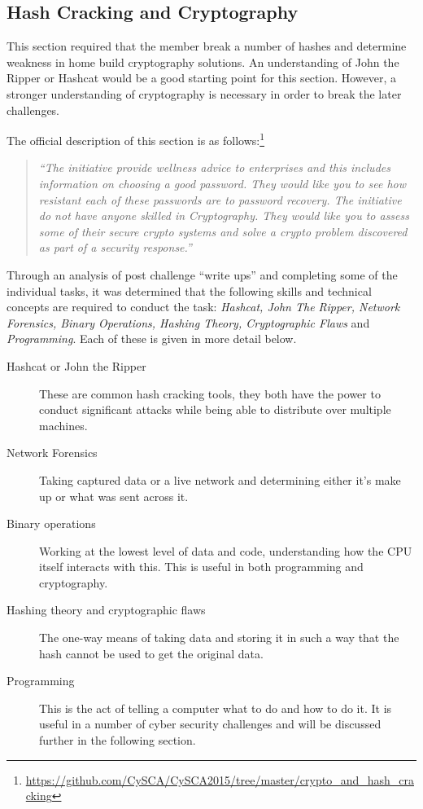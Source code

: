 \documentclass[a4paper,11pt]{report}
\begin{document}
		\subsection{Hash Cracking and Cryptography}
			This section required that the member break a number of hashes and determine weakness in home build cryptography solutions. 
			An understanding of John the Ripper or Hashcat would be a good starting point for this section. 
			However, a stronger understanding of cryptography is necessary in order to break the later challenges. 
			
			The official description of this section is as follows:\footnote{\url{https://github.com/CySCA/CySCA2015/tree/master/crypto\_and\_hash\_cracking}}
			\begin{quote}
				\textit{``The initiative provide wellness advice to enterprises and this includes information on choosing a good password. They would like you to see how resistant each of these passwords are to password recovery. The initiative do not have anyone skilled in Cryptography. They would like you to assess some of their secure crypto systems and solve a crypto problem discovered as part of a security response.''}
			\end{quote}

			Through an analysis of post challenge ``write ups'' and completing some of the individual tasks, 
			it was determined that the following skills and technical concepts are required to conduct the task: 
			\textit{Hashcat, John The Ripper, Network Forensics, Binary Operations, Hashing Theory, Cryptographic Flaws} and \textit{Programming}.
			Each of these is given in more detail below. 
			\begin{description}
				\item[Hashcat or John the Ripper] 
					These are common hash cracking tools, they both have the power to conduct significant attacks while being able to distribute over multiple machines. 
				\item[Network Forensics]
					Taking captured data or a live network and determining either it's make up or what was sent across it. 
				\item[Binary operations] 
					Working at the lowest level of data and code, understanding how the CPU itself interacts with this. 
					This is useful in both programming and cryptography. 
				\item[Hashing theory and cryptographic flaws]
					The one-way means of taking data and storing it in such a way that the hash cannot be used to get the original data. 
				\item[Programming]
					This is the act of telling a computer what to do and how to do it. 
					It is useful in a number of cyber security challenges and will be discussed further in the following section.
			\end{description}
\end{document}
